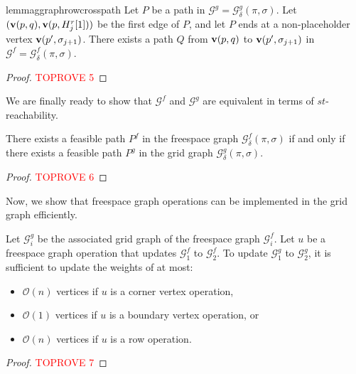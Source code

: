 \documentclass[thm-restate]{lipics-v2021}
\theoremstyle{remark}
\newcommand{\Oh}{\mathcal{O}}
\newcommand{\graph}[0]{\mathcal{G}}
\newcommand{\vertex}[1]{\normalfont \textbf{v}(#1)}
\newcommand{\fsgraph}[0]{\graph^{f}}
\newcommand{\ggraph}[0]{\graph^g}
\begin{document}
\begin{restatable}{lemma}{ggraphrowcrosspath} \label{lem:ggraph-placeholder-row-path}
    Let $P$ be a path in $\ggraph = \ggraph_{\delta}(\pi, \sigma)$. Let $(\vertex{p, q}, \vertex{p, H^r_j[1]})$ be the first edge of $P$, and let $P$ ends at a non-placeholder vertex $\vertex{p', \sigma_{j + 1}}$. There exists a path $Q$ from $\vertex{p, q}$ to $\vertex{p', \sigma_{j + 1}}$ in $\fsgraph = \fsgraph_{\delta}(\pi, \sigma)$.  
\end{restatable}
\begin{proof}\textcolor{red}{TOPROVE 5}\end{proof}

We are finally ready to show that $\fsgraph$ and $\ggraph$ are equivalent in terms of $st$-reachability. 
\begin{lemma} \label{lem:fs-gg-path-equivalent}
    There exists a feasible path $P^f$ in the freespace graph $\fsgraph_\delta(\pi, \sigma)$ if and only if there exists a feasible path $P^g$ in the grid graph $\ggraph_\delta(\pi, \sigma)$. 
\end{lemma}

\begin{proof}\textcolor{red}{TOPROVE 6}\end{proof}

Now, we show that freespace graph operations can be implemented in the grid graph efficiently. 
\begin{lemma} \label{lem:ggraph-number-of-update-per-op}
    Let $\ggraph_i$ be the associated grid graph of the freespace graph $\fsgraph_i$. Let $u$ be a freespace graph operation that updates $\fsgraph_1$ to $\fsgraph_2$. To update $\ggraph_1$ to $\ggraph_2$, it is sufficient to update the weights of at most: 
    \begin{itemize}
        \item $\Oh(n)$ vertices if $u$ is a corner vertex operation,
        \item $\Oh(1)$ vertices if $u$ is a boundary vertex operation, or
        \item $\Oh(n)$ vertices if $u$ is a row operation. 
    \end{itemize}
\end{lemma}

\begin{proof}\textcolor{red}{TOPROVE 7}\end{proof}
\end{document}
